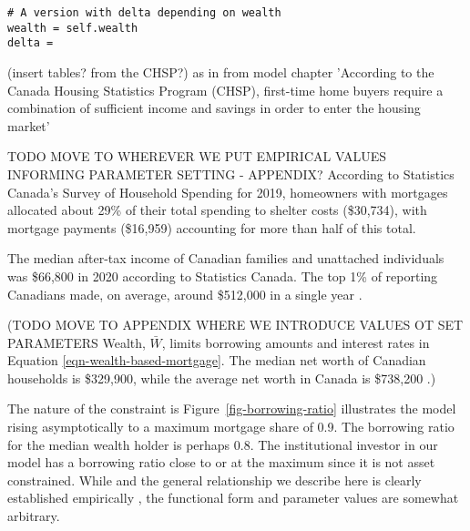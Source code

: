 \begin{description}
\begin{lstlisting}
# A version with delta depending on wealth
wealth = self.wealth
delta =
\end{lstlisting}


\end{description}



(insert tables? from the CHSP?) as in from model chapter 'According to the Canada Housing Statistics Program (CHSP), first-time home buyers require a combination of sufficient income and savings in order to enter the housing market'

TODO MOVE TO WHEREVER WE PUT EMPIRICAL VALUES INFORMING PARAMETER SETTING - APPENDIX? According to Statistics Canada's Survey of Household Spending for 2019, \cite{statisticscanadaSurveyHouseholdSpending2021} homeowners with mortgages allocated about 29\% of their total  spending to shelter costs (\$30,734), with mortgage payments (\$16,959) accounting for more than half of this total.

The median after-tax income of Canadian families and unattached individuals was \$66,800 in 2020 according to Statistics Canada. %
 The top 1\% of reporting Canadians made, on average, around \$512,000 in a single year \cite{WEB_model-stats-can-canadian-incomes}. %


(TODO MOVE TO APPENDIX WHERE WE INTRODUCE VALUES OT SET PARAMETERS Wealth, $\bar W$, limits borrowing amounts and interest rates in Equation \ref{eqn-wealth-based-mortgage}. The median net worth of Canadian households is \$329,900, while the average net worth in Canada is \$738,200 \cite{WEB-model-stats-can-median-net-worth}.)

The nature of the constraint is
Figure~\ref{fig-borrowing-ratio} illustrates the model rising asymptotically to a maximum mortgage share of 0.9. %
The borrowing ratio for the median wealth holder is perhaps 0.8. The institutional investor in our model has a borrowing ratio close to or at the maximum since it is not asset constrained. While and the general relationship we describe here is clearly established empirically \cite{GET_SOURCE}, the functional form and parameter values are somewhat arbitrary. %


